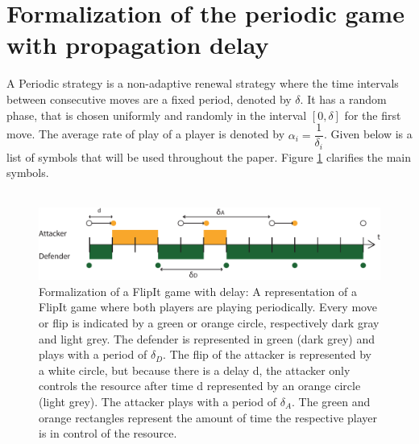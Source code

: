 \section{Formalization of the periodic game with propagation delay}
\label{ch2:periodicvirus}

 A Periodic strategy is a non-adaptive renewal strategy where the time intervals between consecutive moves are a fixed period, denoted by $\delta$. It has a random phase, that is chosen uniformly and randomly in the interval $[0,\delta]$ for the first move. The average rate of play of a player is denoted by $\alpha_{i} = \dfrac{1}{\delta_{i}}$. Given below is a list of symbols that will be used throughout the paper. Figure \ref{FlipItDelay} clarifies the main symbols.\\
~~\\

\begin{figure}[hbtp]
\centering
\includegraphics[scale=0.7]{Images/DefFlip.pdf}
\caption{Formalization of a FlipIt game with delay: A representation of a FlipIt game where both players are playing periodically. Every move or flip is indicated by a green or orange circle, respectively dark gray and light grey.  The defender is represented in green (dark grey) and plays with a period of $\delta_{D}$. The flip of the attacker is represented by a white circle, but because there is a delay d, the attacker only controls the resource after time d represented by an orange circle (light grey). The attacker plays with a period of $\delta_{A}$. The green and orange rectangles represent the amount of time the respective player is in control of the resource.}
\label{FlipItDelay}
\end{figure}

